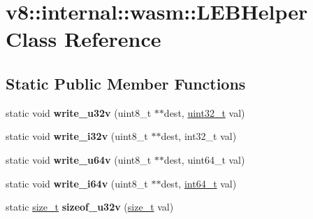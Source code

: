 \hypertarget{classv8_1_1internal_1_1wasm_1_1LEBHelper}{}\section{v8\+:\+:internal\+:\+:wasm\+:\+:L\+E\+B\+Helper Class Reference}
\label{classv8_1_1internal_1_1wasm_1_1LEBHelper}
\subsection*{Static Public Member Functions}
\begin{DoxyCompactItemize}
\item 
\mbox{\label{classv8_1_1internal_1_1wasm_1_1LEBHelper_aba7fa211b585d23907e2f97810c14326}} 
static void {\bfseries write\+\_\+u32v} (uint8\+\_\+t $\ast$$\ast$dest, \mbox{\hyperlink{classuint32__t}{uint32\+\_\+t}} val)
\item 
\mbox{\label{classv8_1_1internal_1_1wasm_1_1LEBHelper_a1d94e880cd7a12a4002c58174000e2bb}} 
static void {\bfseries write\+\_\+i32v} (uint8\+\_\+t $\ast$$\ast$dest, int32\+\_\+t val)
\item 
\mbox{\label{classv8_1_1internal_1_1wasm_1_1LEBHelper_ac312fc7d02c81db9d566a6ba97cb310a}} 
static void {\bfseries write\+\_\+u64v} (uint8\+\_\+t $\ast$$\ast$dest, uint64\+\_\+t val)
\item 
\mbox{\label{classv8_1_1internal_1_1wasm_1_1LEBHelper_ae3a71ed3e2355fcdc44da66c703d42de}} 
static void {\bfseries write\+\_\+i64v} (uint8\+\_\+t $\ast$$\ast$dest, \mbox{\hyperlink{classint64__t}{int64\+\_\+t}} val)
\item 
\mbox{\label{classv8_1_1internal_1_1wasm_1_1LEBHelper_a885e13dc8eea95f5a5e97c923e6f32e7}} 
static \mbox{\hyperlink{classsize__t}{size\+\_\+t}} {\bfseries sizeof\+\_\+u32v} (\mbox{\hyperlink{classsize__t}{size\+\_\+t}} val)
\item 
\mbox{\label{classv8_1_1internal_1_1wasm_1_1LEBHelper_aba06ba5c995cdc76456d5ee1194c1beb}} 

\end{DoxyCompactItemize}
